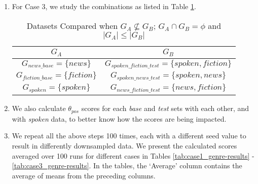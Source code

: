 \begin{enumerate}
    \item For Case 3, we study the combinations as listed in Table \ref{tab:case3_genre}.
        \begin{table}[H]
            \centering
            \begin{tabular}{|c|c|}
                \hline
                \textbf{$G_{A}$} & \textbf{$G_{B}$} \\
                \hline
                $G_{news\_base} = \{news\}$ & $G_{spoken\_fiction\_test} = \{spoken, fiction\}$\\
                $G_{fiction\_base} = \{fiction\}$ & $G_{spoken\_news\_test} = \{spoken, news\}$\\
                $G_{spoken} = \{spoken\}$ & $G_{news\_fiction\_test} = \{news, fiction\}$\\
                \hline
            \end{tabular}
            \caption{Datasets Compared when $G_{A} \not \subseteq G_{B}$; $G_{A} \cap G_{B} = \phi$ and $\vert G_{A} \vert \leq \vert G_{B} \vert$}
            \label{tab:case3_genre}
        \end{table}
    \item We also calculate $\theta_{pos}$ scores for each \textit{base} and \textit{test} sets with each other, and with \textit{spoken} data, to better know how the scores are being impacted.
    \item We repeat all the above steps 100 times, each with a different seed value to result in differently downsampled data. We present the calculated scores averaged over 100 runs for different cases in Tables \ref{tab:case1_genre-results} - \ref{tab:case3_genre-results}. In the tables, the `Average' column contains the average of means from the preceding columns.
\end{enumerate}

